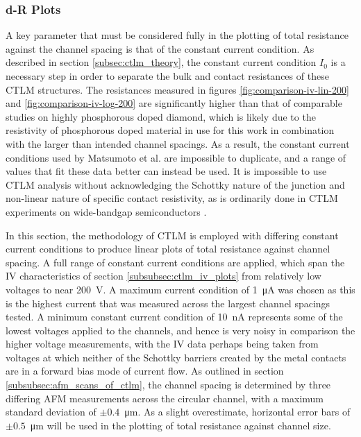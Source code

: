 \begin{refsection}
\subsubsection{d-R Plots}
A key parameter that must be considered fully in the plotting of total resistance against the channel spacing is that of the constant current condition. As described in section \ref{subsec:ctlm_theory}, the constant current condition $I_{0}$ is a necessary step in order to separate the bulk and contact resistances of these CTLM structures. The resistances measured in figures \ref{fig:comparison-iv-lin-200} and \ref{fig:comparison-iv-log-200} are significantly higher than that of comparable studies on highly phosphorous doped diamond, which is likely due to the resistivity of phosphorous doped material in use for this work in combination with the larger than intended channel spacings. As a result, the constant current conditions used by Matsumoto et al. \cite{matsumoto2013} are impossible to duplicate, and a range of values that fit these data better can instead be used. It is impossible to use CTLM analysis without acknowledging the Schottky nature of the junction and non-linear nature of specific contact resistivity, as is ordinarily done in CTLM experiments on wide-bandgap semiconductors \cite{Wojtasiak2018}.

\label{subsubsec:ctlm_dr_plots}
In this section, the methodology of CTLM is employed with differing constant current conditions to produce linear plots of total resistance against channel spacing. A full range of constant current conditions are applied, which span the IV characteristics of section \ref{subsubsec:ctlm_iv_plots} from relatively low voltages to near 200~\si{\volt}. A maximum current condition of 1~\si{\micro\ampere} was chosen as this is the highest current that was measured across the largest channel spacings tested. A minimum constant current condition of 10~\si{\nano\ampere} represents some of the lowest voltages applied to the channels, and hence is very noisy in comparison the higher voltage measurements, with the IV data perhaps being taken from voltages at which neither of the Schottky barriers created by the metal contacts are in a forward bias mode of current flow. As outlined in section \ref{subsubsec:afm_scans_of_ctlm}, the channel spacing is determined by three differing AFM measurements across the circular channel, with a maximum standard deviation of $\pm0.4$~\si{\micro\metre}. As a slight overestimate, horizontal error bars of $\pm0.5$~\si{\micro\metre} will be used in the plotting of total resistance against channel size.


\end{refsection}
